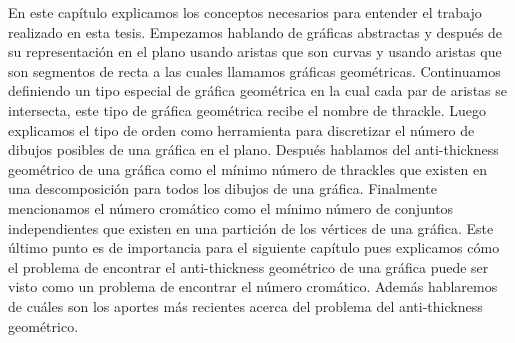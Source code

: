 En este capítulo explicamos los conceptos necesarios para entender el trabajo
realizado en esta tesis. Empezamos hablando de gráficas abstractas y después de
su representación en el plano usando aristas que son curvas y usando aristas
que son segmentos de recta a las cuales llamamos gráficas geométricas.
Continuamos definiendo un tipo especial de gráfica geométrica en la cual cada
par de aristas se intersecta, este tipo de gráfica geométrica recibe el nombre
de thrackle. Luego explicamos el tipo de orden como herramienta para
discretizar el número de dibujos posibles de una gráfica en el plano.
Después hablamos del anti-thickness geométrico de una gráfica como el mínimo
número de thrackles que existen en una descomposición para todos los dibujos de
una gráfica. Finalmente mencionamos el número cromático como el mínimo número
de conjuntos independientes que existen en una partición de los vértices de una
gráfica. Este último punto es de importancia para el siguiente capítulo pues
explicamos cómo el problema de encontrar el anti-thickness geométrico de una
gráfica puede ser visto como un problema de encontrar el número cromático.
Además hablaremos de cuáles son los aportes más recientes acerca del problema
del anti-thickness geométrico.
